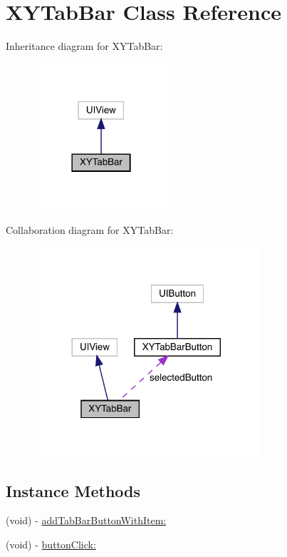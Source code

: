 \hypertarget{interface_x_y_tab_bar}{}\section{X\+Y\+Tab\+Bar Class Reference}
\label{interface_x_y_tab_bar}


Inheritance diagram for X\+Y\+Tab\+Bar\+:\nopagebreak
\begin{figure}[H]
\begin{center}
\leavevmode
\includegraphics[width=141pt]{interface_x_y_tab_bar__inherit__graph}
\end{center}
\end{figure}


Collaboration diagram for X\+Y\+Tab\+Bar\+:\nopagebreak
\begin{figure}[H]
\begin{center}
\leavevmode
\includegraphics[width=236pt]{interface_x_y_tab_bar__coll__graph}
\end{center}
\end{figure}
\subsection*{Instance Methods}
\begin{DoxyCompactItemize}
\item 
(void) -\/ \mbox{\hyperlink{interface_x_y_tab_bar_a88d5e58c3eefbbc798a9a50c35d5fcda}{add\+Tab\+Bar\+Button\+With\+Item\+:}}
\item 
(void) -\/ \mbox{\hyperlink{interface_x_y_tab_bar_a8025d345fc8661211bb1a1b5201d652d}{button\+Click\+:}}
\end{DoxyCompactItemize}
